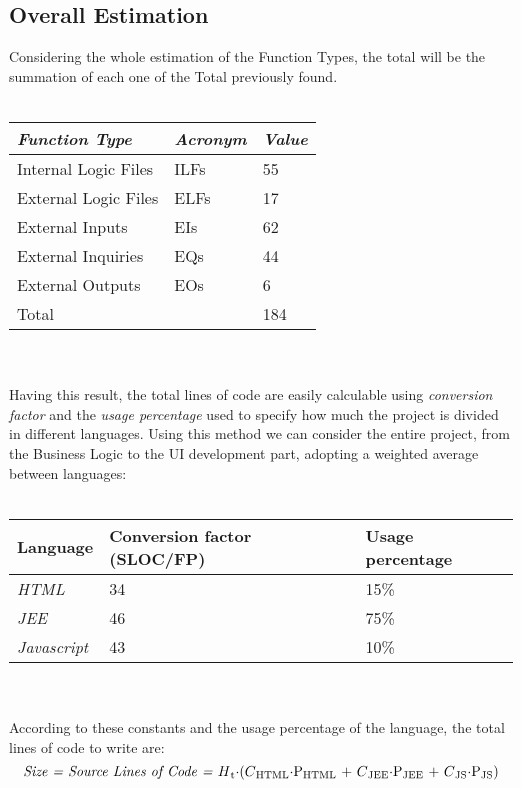 \documentclass[11pt,a4paper]{report}
\begin{document}
\subsection{Overall Estimation}
Considering the whole estimation of the Function Types, the total will be the summation of each one of the Total previously found. 
\\\\
\begin{tabularx}{\textwidth}{|X|X|X|}
	\hline
	\textit{Function Type} & \textit{Acronym} & \textit{Value}\\
	\hline
	Internal Logic Files & ILFs & 55\\
	\hline
	External Logic Files & ELFs & 17\\
	\hline
	External Inputs & EIs & 62\\
	\hline
	External Inquiries & EQs & 44\\
	\hline
	External Outputs & EOs & 6\\
	\hline
	\hline
	Total & \multicolumn{1}{X}{} & \multicolumn{1}{X|}{184}\\
	\hline
\end{tabularx}
\\\\
Having this result, the total lines of code are easily calculable using   \textit{conversion factor} and the \textit{usage percentage} used to specify how much the project is divided in different languages. Using this method we can consider the entire project, from the Business Logic to the UI development part, adopting a weighted average between languages:
\\\\
\begin{tabularx}{\textwidth}{|X|X|X|}
	\hline
	\textbf{Language} & \textbf{Conversion factor (SLOC/FP)} & \textbf{Usage percentage}\\
	\hline
	\textit{HTML} & 34 & 15\%\\
	\hline
	\textit{JEE} & 46 & 75\%\\
	\hline
	\textit{Javascript} & 43 & 10\%\\
	\hline
\end{tabularx}
\\\\
According to these constants and the usage percentage of the language, the total lines of code to write are:\\
\begin{equation}
	\centerline{\textit{Size = Source Lines of Code =} $H\textsubscript{t}\cdot$($C\textsubscript{HTML}\cdot$P\textsubscript{HTML} + $C\textsubscript{JEE}\cdot$P\textsubscript{JEE} + $C\textsubscript{JS}\cdot$P\textsubscript{JS})}
\end{equation}
\end{document}
